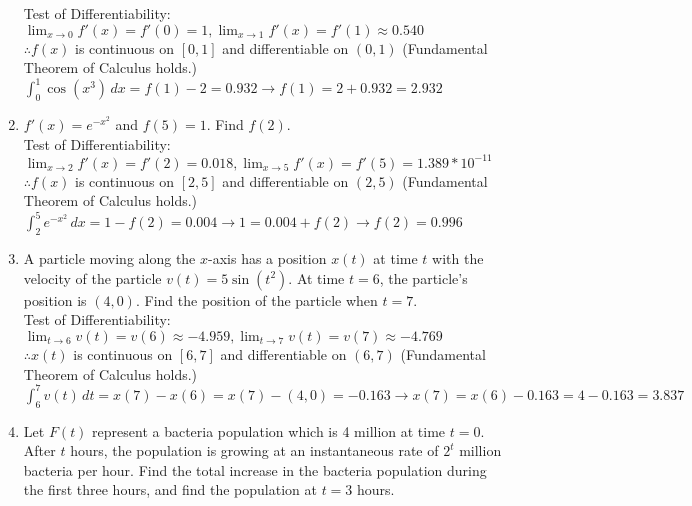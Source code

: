 \documentclass[10pt, letterpaper]{report}
\begin{document}
\begin{enumerate}
      Test of Differentiability:
      $\lim_{x \to 0}f'(x)=f'(0)=1,
      \lim_{x \to 1}f'(x)=f'(1)\approx0.540 $ \\
      $\therefore f(x)$ is continuous on $[0,1]$ and differentiable on $(0,1)$ (Fundamental Theorem of Calculus holds.) \\

			$\int_{0}^{1}{\cos{(x^{3})}}\,dx=
      f(1)-2=0.932\rightarrow f(1)=2+0.932=2.932$ \\

		\item{$f'(x)=e^{-x^{2}}$ and $f(5)=1$. Find $f(2)$.} \\

      Test of Differentiability:
      $\lim_{x \to 2}f'(x)=f'(2)=0.018,
       \lim_{x \to 5}f'(x)=f'(5)=1.389*10^{-11} $ \\
       $\therefore f(x)$ is continuous on $[2,5]$ and differentiable on $(2,5)$ (Fundamental Theorem of Calculus holds.) \\

			$\int_{2}^{5}{e^{-x^{2}}}\,dx=1-f(2)=
      0.004\rightarrow 1=0.004+f(2)\rightarrow f(2)=0.996$ \\

		\item{A particle moving along the $x$-axis has a position $x(t)$ at time $t$ with the velocity of the particle $v(t)=5\sin{(t^{2})}$. At time $t=6$, the particle's position is $(4,0)$. Find the position of the particle when $t=7$.} \\

      Test of Differentiability:
      $\lim_{t\to 6}v(t)=v(6)\approx-4.959,
      \lim_{t\to 7}v(t)=v(7)\approx-4.769$ \\
      $\therefore x(t)$ is continuous on $[6,7]$ and differentiable on $(6,7)$ (Fundamental Theorem of Calculus holds.) \\

      $\int_{6}^{7}{v(t)}\,dt=
      x(7)-x(6)=x(7)-(4,0)=-0.163\rightarrow
      x(7)=x(6)-0.163=4-0.163=3.837$ \\

		\item{Let $F(t)$ represent a bacteria population which is 4 million at time $t=0$. After $t$ hours, the population is growing at an instantaneous rate of $2^{t}$ million bacteria per hour. Find the total increase in the bacteria population during the first three hours, and find the population at $t=3$ hours. } \\


\end{enumerate}
\end{document}
